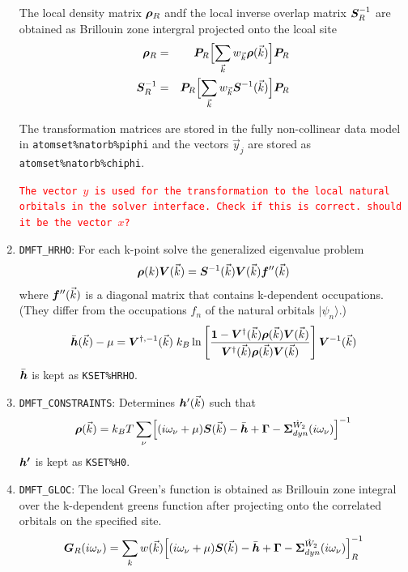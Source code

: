 \documentclass[11pt,a4paper]{report}
\newcommand{\petertt}[1]{\textcolor{red}{\texttt{#1}}}
\begin{document}
\begin{enumerate}
The local density matrix $\bm{\rho}_R$ andf the local inverse overlap
matrix $\bm{S}^{-1}_R$ are obtained as Brillouin zone intergral
projected onto the lcoal site
\begin{eqnarray}
\bm{\rho}_R&=&\bm{P}_R\Bigl[
\sum_{\vec{k}} w_{\vec{k}}\bm{\rho}(\vec{k})
\Bigr]\bm{P}_R
\nonumber\\
\bm{S}^{-1}_R&=&\bm{P}_R\Bigl[
\sum_{\vec{k}} w_{\vec{k}}\bm{S}^{-1}(\vec{k})
\Bigr]\bm{P}_R
\end{eqnarray}

The transformation matrices are stored in the fully non-collinear data
model in \verb|atomset%natorb%piphi| and the vectors $\vec{y}_j$ are
stored as \verb|atomset%natorb%chiphi|.

\petertt{The vector $y$ is used for the transformation to the local
  natural orbitals in the solver interface. Check if this is
  correct. should it be the vector $x$?}
%
\item \verb|DMFT_HRHO|: For each k-point solve the generalized
  eigenvalue problem
\begin{eqnarray*}
\bm{\rho}(k)\bm{V}(\vec{k})=
\bm{S}^{-1}(\vec{k})\bm{V}(\vec{k})\bm{f}''(\vec{k})
\end{eqnarray*}
where $\bm{f}''(\vec{k})$ is a diagonal matrix that contains
k-dependent occupations. (They differ from the occupations $f_n$ of
the natural orbitals $|\psi_n\rangle$.)
\begin{eqnarray}
\bar{\bm{h}}(\vec{k})-\mu=\bm{V}^{\dagger,-1}(\vec{k})\; k_B
\ln\left[
\frac{\bm{1}-\bm{V}^\dagger(\vec{k})\bm{\rho}(\vec{k})\bm{V}(\vec{k})}
{\bm{V}^\dagger(\vec{k})\bm{\rho}(\vec{k})\bm{V}(\vec{k})}
\right]\bm{V}^{-1}(\vec{k})
\end{eqnarray}
$\bar{\bm{h}}$ is kept as \verb|KSET%HRHO|.
%
\item \verb|DMFT_CONSTRAINTS|: Determines $\bm{h}'(\vec{k})$ such that
\begin{eqnarray}
\bm{\rho}(\vec{k})=k_BT\sum_\nu \Bigl[(i\omega_\nu+\mu)\bm{S}(\vec{k})-
\bar{\bm{h}}+\bm{\Gamma}-\bm{\Sigma}^{\hat{W}_2}_{dyn}(i\omega_\nu)\Bigr]^{-1}
\end{eqnarray}
$\bm{h'}$ is kept as \verb|KSET%H0|.
%
\item \verb|DMFT_GLOC|: The local Green's function is obtained as
  Brillouin zone integral over the k-dependent greens function after
  projecting onto the correlated orbitals on the specified site.
\begin{eqnarray}
\bm{G}_R(i\omega_\nu)=\sum_k w(\vec{k})
\Bigl[(i\omega_\nu+\mu)\bm{S}(\vec{k})-
\bar{\bm{h}}+\bm{\Gamma}-\bm{\Sigma}^{\hat{W}_2}_{dyn}(i\omega_\nu)\Bigr]^{-1}_R
\end{eqnarray}


\end{enumerate}
\end{document}
